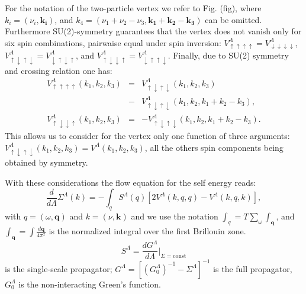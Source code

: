 For the notation of the two-particle vertex we refer to Fig. (fig), where $k_i=(\nu_i,\mathbf{k_i})$,
and $k_4=(\nu_1+\nu_2-\nu_3,\mathbf{k_1+k_2-k_3})$ can be omitted. 
Furthermore  SU(2)-symmetry guarantees that the vertex does not vanish only for six spin combinations, pairwaise equal under spin inversion:
$
 V^\Lambda_{\uparrow\uparrow\uparrow\uparrow} = V^\Lambda_{\downarrow\downarrow\downarrow\downarrow}$, 
$  V^\Lambda_{\uparrow\downarrow\uparrow\downarrow} = V^\Lambda_{\downarrow\uparrow\downarrow\uparrow}  $, and
$  V^\Lambda_{\uparrow\downarrow\downarrow\uparrow } = V^\Lambda_{\downarrow\uparrow\uparrow\downarrow}$.   
Finally, due to SU(2) symmetry and crossing relation one has: 
\begin{eqnarray}
\nonumber
V^\Lambda_{\uparrow\uparrow\uparrow\uparrow}(k_1,k_2,k_3) &=& V^\Lambda_{\uparrow\downarrow\uparrow\downarrow}(k_1,k_2,k_3)\\&-& V^\Lambda_{\uparrow\downarrow\uparrow\downarrow}(k_1,k_2,k_1+k_2-k_3), \\ 
V^\Lambda_{\uparrow\downarrow\downarrow\uparrow}(k_1,k_2,k_3)& =& -V^\Lambda_{\uparrow\downarrow\uparrow\downarrow}(k_1,k_2,k_1+k_2-k_3).
\end{eqnarray}
This allows us to consider for the vertex only one function of three arguments:  $V^\Lambda_{\uparrow\downarrow\uparrow\downarrow}(k_1,k_2,k_3)=V^\Lambda(k_1,k_2,k_3)$, all the others spin components being obtained by symmetry. 

With these considerations the flow equation for the self energy reads: 
\begin{equation}
\frac{d}{d \Lambda} \Sigma^\Lambda(k)= -\int_q  S^\Lambda(q)\left[2V^\Lambda(k,q,q) -V^\Lambda(k,q,k)\right], 
\end{equation}
with $q=(\omega,\mathbf{q})$ and $k = (\nu,\mathbf{k})$ and we use the notation  $\int_{q} =T\sum_\omega \int_{\mathbf{q}}$, and $\int_{\mathbf{q}}=\int  \frac{d\mathbf{q}}{4\pi^2}$ is the normalized integral over the first Brillouin zone. 
\begin{equation}
 S^\Lambda=\frac{dG^\Lambda}{d\Lambda}\Bigg|_{\Sigma=\mathrm{const}} 
\end{equation}
  is the single-scale propagator; $G^\Lambda=\left[(G_0^\Lambda)^{-1}-\Sigma^\Lambda\right]^{-1}$ is the full propagator,  $G_0^\Lambda$ is the non-interacting Green's function. 
  
